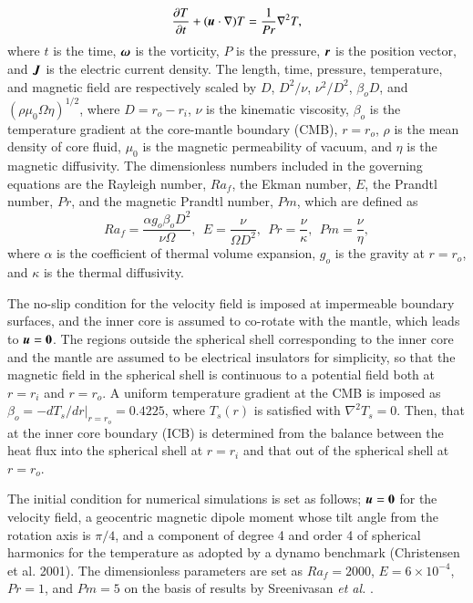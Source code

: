 %
\begin{equation}
\frac{\partial T}{\partial t} 
 + ( \mbox{\boldmath$u$} \cdot \nabla ) T =
 \frac{1}{Pr} \nabla^2 T ,
\label{eq:heat}
\end{equation}
%
where $t$ is the time, $\mbox{\boldmath$\omega$}$ is the vorticity, $P$ is the pressure, $\mbox{\boldmath$r$}$ is the position vector, and $\mbox{\boldmath$J$}$ is the electric current density.
The length, time, pressure, temperature, and magnetic field are respectively scaled by $D$, $D^2/\nu$, $\nu^2 /D^2$, $\beta_o D$, and $(\rho \mu_0 \Omega \eta )^{1/2}$, where $D = r_o - r_i$, $\nu$ is the kinematic viscosity, $\beta_o$ is the temperature gradient at the core-mantle boundary (CMB), $r = r_o$, $\rho$ is the mean density of core fluid, $\mu_0$ is the magnetic permeability of vacuum, and $\eta$ is the magnetic diffusivity.
The dimensionless numbers included in the governing equations are the Rayleigh number, $Ra_f$, the Ekman number, $E$, the Prandtl number, $Pr$, and the magnetic Prandtl number, $Pm$, which are defined as
%
\begin{equation}
Ra_f = \frac{\alpha g_o \beta_o D^2}{\nu \Omega},~~
E = \frac{\nu}{\Omega D^2},~~
Pr = \frac{\nu}{\kappa},~~
Pm = \frac{\nu}{\eta},
\label{eq:dimensionless_numbers}
\end{equation}
%
where $\alpha$ is the coefficient of thermal volume expansion, $g_o$ is the gravity at $r = r_o$, and $\kappa$ is the thermal diffusivity.

The no-slip condition for the velocity field is imposed at impermeable boundary surfaces, and the inner core is assumed to co-rotate with the mantle, which leads to $\mbox{\boldmath$u$} = {\bf 0}$.
The regions outside the spherical shell corresponding to the inner core and the mantle are assumed to be electrical insulators for simplicity, so that the magnetic field in the spherical shell is continuous to a potential field both at $r = r_i$ and $r = r_o$.
A uniform temperature gradient at the CMB is imposed as $\beta_o = -d T_s / dr |_{r = r_o} = 0.4225$, where $T_s (r)$ is satisfied with $\nabla^2 T_s = 0$.
Then, that at the inner core boundary (ICB) is determined from the balance between the heat flux into the spherical shell at $r = r_i$ and that out of the spherical shell at $r = r_o$.

The initial condition for numerical simulations is set as follows; $\mbox{\boldmath$u$} = {\bf 0}$ for the velocity field, a geocentric magnetic dipole moment whose tilt angle from the rotation axis is $\pi / 4$, and a component of degree 4 and order 4 of spherical harmonics for the temperature as adopted by a dynamo benchmark (Christensen et al. 2001).
The dimensionless parameters are set as $Ra_f = 2000$, $E = 6 \times 10^{-4}$, $Pr = 1$, and $Pm = 5$ on the basis of results by Sreenivasan {\it et al.} \cite{Sreenivasan:2014}.

